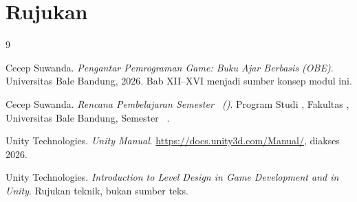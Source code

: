 
\clearpage
{}
{}
\section*{Rujukan}

\begin{thebibliography}{9}
\setlength{\itemsep}{0.35em}

Cecep Suwanda. \emph{Pengantar Pemrograman Game: Buku Ajar Berbasis
 (OBE)}. Universitas Bale Bandung, 2026.
Bab XII--XVI menjadi sumber konsep modul ini.

Cecep Suwanda. \emph{Rencana Pembelajaran Semester \NamaMK\ (\KodeMK)}.
Program Studi \NamaProdi, Fakultas \NamaFakultas, Universitas Bale Bandung,
Semester \SemesterMK\ \TahunAkademik.

Unity Technologies. \emph{Unity Manual}. \url{https://docs.unity3d.com/Manual/},
diakses 2026.

Unity Technologies. \emph{Introduction to Level Design in Game Development
and in Unity}. Rujukan teknik, bukan sumber teks.

\end{thebibliography}
